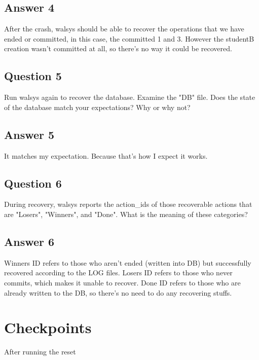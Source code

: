\documentclass[12pt]{article}
\begin{document}
\subsection*{Answer 4} After the crash, wal\-sys should be able to recover the operations that we have ended or committed, in this case, the committed 1 and 3. However the studentB creation wasn't committed at all, so there's no way it could be recovered.

\subsection*{Question 5} Run wal\-sys again to recover the database. Examine the "DB" file. Does the state of the database match your expectations? Why or why not?

\subsection*{Answer 5} It matches my expectation. Because that's how I expect it works.

\subsection*{Question 6} During recovery, wal\-sys reports the action\_ids of those recoverable actions that are "Losers", "Winners", and "Done". What is the meaning of these categories?

\subsection*{Answer 6} Winners ID refers to those who aren't ended (written into DB) but successfully recovered according to the LOG files. Losers ID refers to those who never commits, which makes it unable to recover. Done ID refers to those who are already written to the DB, so there's no need to do any recovering stuffs.

\section*{Checkpoints}

After running the reset 
\end{document}
